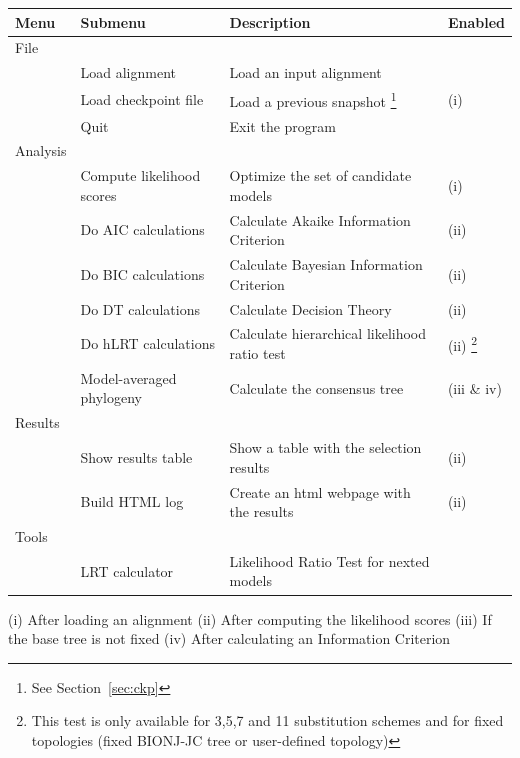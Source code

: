 \documentclass[11pt,twoside,a4paper]{article}
\begin{document}
\begin{minipage}{1\textwidth}
\small
\begin{tabular}{l l l l}
\hline
{\bf Menu} & {\bf Submenu} & {\bf Description} & {\bf Enabled} \\
\hline
File \\
& Load alignment & Load an input alignment & \\
& Load checkpoint file & Load a previous snapshot \footnote{See Section~\ref{sec:ckp}} & (i) \\
& Quit & Exit the program & \\
\hline
Analysis \\
& Compute likelihood scores & Optimize the set of candidate models & (i) \\
& Do AIC calculations & Calculate Akaike Information Criterion & (ii) \\
& Do BIC calculations & Calculate Bayesian Information Criterion & (ii) \\
& Do DT calculations & Calculate Decision Theory & (ii) \\
& Do hLRT calculations & Calculate hierarchical likelihood ratio test & (ii) \footnote{This test is only available for 3,5,7 and 11 substitution schemes and for fixed topologies (fixed BIONJ-JC tree or user-defined topology)} \\
& Model-averaged phylogeny & Calculate the consensus tree & (iii \& iv)  \\
\hline
Results \\
& Show results table & Show a table with the selection results & (ii) \\
& Build HTML log & Create an html webpage with the results & (ii) \\
\hline
Tools \\
& LRT calculator & Likelihood Ratio Test for nexted models & \\
\hline
\end{tabular}

\vspace{1em}
(i) After loading an alignment (ii) After computing the likelihood scores (iii) If the base tree is not fixed (iv) After calculating an Information Criterion
\end{minipage}





\end{document}
